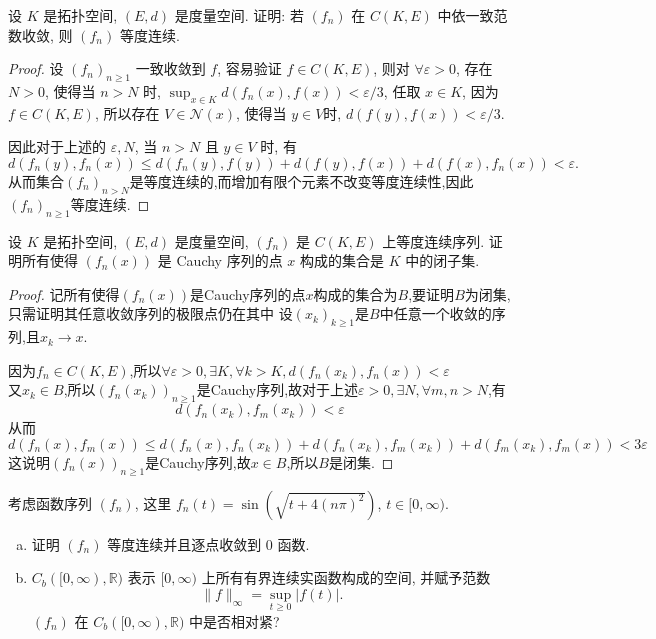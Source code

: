 




\begin{exercise}
    设 $K$ 是拓扑空间, $(E,d)$ 是度量空间. 证明: 
    若 $(f_{n})$ 在 $C(K, E)$ 中依一致范数收敛, 则 $(f_{n})$ 等度连续.
\end{exercise}

\begin{proof}
    设 $(f_n)_{n\geq 1}$ 一致收敛到 $f$, 容易验证 $f\in C(K,E)$,
    则对 $\forall\varepsilon>0$, 存在 $N>0$, 使得当 $n>N$ 时,
    $\sup_{x\in K}d(f_n(x),f(x))<\varepsilon/3$,
    任取 $x\in K$, 因为 $f\in C(K,E)$, 所以存在 $V\in\mathcal{N}(x)$,
    使得当 $y\in V$时, $d(f(y),f(x))<\varepsilon/3$.

    因此对于上述的 $\varepsilon,N$, 当 $n>N$ 且 $y\in V$ 时, 有
    \[d(f_n(y),f_n(x))\leq d(f_n(y),f(y))+d(f(y),f(x))+d(f(x),f_n(x))<\varepsilon.\]
    从而集合$(f_n)_{n>N}$是等度连续的,而增加有限个元素不改变等度连续性,因此$(f_n)_{n\geq 1}$等度连续.
\end{proof}



\begin{exercise}
    设 $K$ 是拓扑空间, $(E, d)$ 是度量空间, $(f_{n})$ 是 $C(K, E)$ 上等度连续序列. 
    证明所有使得 $(f_{n}(x))$ 是 Cauchy 序列的点 $x$ 构成的集合是 $K$ 中的闭子集.
\end{exercise}

\begin{proof}
记所有使得$(f_n(x))$是Cauchy序列的点$x$构成的集合为$B$,要证明$B$为闭集,只需证明其任意收敛序列的极限点仍在其中
设$(x_k)_{k\geq 1}$是$B$中任意一个收敛的序列,且$x_k\to x$.

因为$f_n\in C(K,E)$,所以$\forall\varepsilon>0,\exists K,\forall k>K,d(f_n(x_k),f_n(x))<\varepsilon$\\
又$x_k\in B$,所以$(f_n(x_k))_{n\geq 1}$是Cauchy序列,故对于上述$\varepsilon>0,\exists N,\forall m,n>N$,有
\[d(f_n(x_k),f_m(x_k))<\varepsilon\]
从而\[d(f_n(x),f_m(x))\leq d(f_n(x),f_n(x_k))+d(f_n(x_k),f_m(x_k))+d(f_m(x_k),f_m(x))<3\varepsilon\]
这说明$(f_n(x))_{n\geq 1}$是Cauchy序列,故$x\in B$,所以$B$是闭集.
\end{proof}



\begin{exercise}
  考虑函数序列 $(f_{n})$, 这里 $f_{n}(t)=\sin\left(\sqrt{t+4(n\pi)^2}\right)$, $t\in[0,\infty)$.
  \begin{enumerate}[(a)]
    \item 证明 $(f_{n})$ 等度连续并且逐点收敛到 $0$ 函数.
    \item $C_{b}([0,\infty),\mathbb{R})$ 表示 $[0, \infty)$ 上所有有界连续实函数构成的空间, 并赋予范数
    \[\|f\|_{\infty}=\sup_{t\geq 0}|f(t)|.\]
    $(f_n)$ 在 $C_b([0,\infty),\mathbb{R})$ 中是否相对紧?
  \end{enumerate}
\end{exercise}

